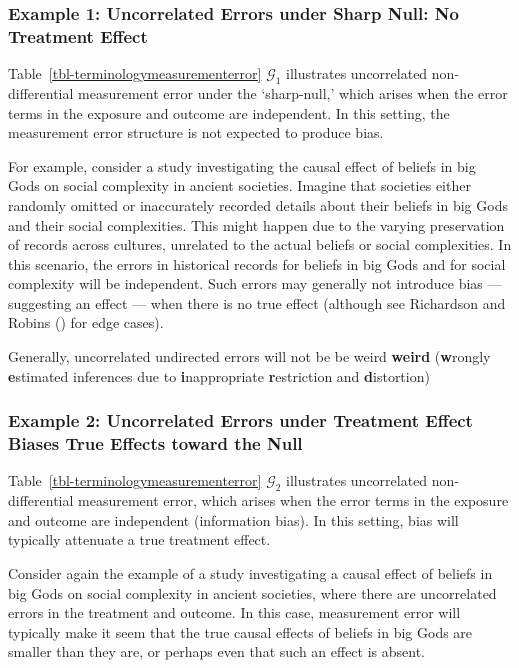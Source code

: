 \documentclass[
  single column]{article}
\begin{document}
\subsubsection{Example 1: Uncorrelated Errors under Sharp Null: No
Treatment
Effect}\label{example-1-uncorrelated-errors-under-sharp-null-no-treatment-effect}

Table~\ref{tbl-terminologymeasurementerror} \(\mathcal{G}_1\)
illustrates uncorrelated non-differential measurement error under the
`sharp-null,' which arises when the error terms in the exposure and
outcome are independent. In this setting, the measurement error
structure is not expected to produce bias.

For example, consider a study investigating the causal effect of beliefs
in big Gods on social complexity in ancient societies. Imagine that
societies either randomly omitted or inaccurately recorded details about
their beliefs in big Gods and their social complexities. This might
happen due to the varying preservation of records across cultures,
unrelated to the actual beliefs or social complexities. In this
scenario, the errors in historical records for beliefs in big Gods and
for social complexity will be independent. Such errors may generally not
introduce bias --- suggesting an effect --- when there is no true effect
(although see Richardson and Robins
() for edge cases).

Generally, uncorrelated undirected errors will not be be weird
\textbf{weird} (\textbf{w}rongly \textbf{e}stimated inferences due to
\textbf{i}nappropriate \textbf{r}estriction and \textbf{d}istortion)

\subsubsection{Example 2: Uncorrelated Errors under Treatment Effect
Biases True Effects toward the
Null}\label{example-2-uncorrelated-errors-under-treatment-effect-biases-true-effects-toward-the-null}

Table~\ref{tbl-terminologymeasurementerror} \(\mathcal{G}_2\)
illustrates uncorrelated non-differential measurement error, which
arises when the error terms in the exposure and outcome are independent
(information bias). In this setting, bias will typically attenuate a
true treatment effect.

Consider again the example of a study investigating a causal effect of
beliefs in big Gods on social complexity in ancient societies, where
there are uncorrelated errors in the treatment and outcome. In this
case, measurement error will typically make it seem that the true causal
effects of beliefs in big Gods are smaller than they are, or perhaps
even that such an effect is absent.
\end{document}
